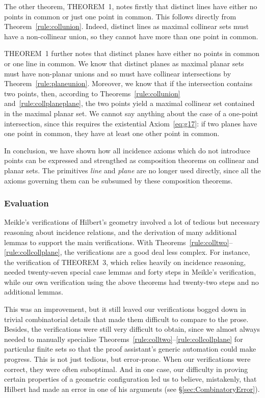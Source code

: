 The other theorem, THEOREM~1, notes firstly that distinct lines have either no points in common or just one point in common. This follows directly from Theorem~\ref{rule:collunion}. Indeed, distinct lines as maximal collinear sets must have a non-collinear union, so they cannot have more than one point in common.

THEOREM~1 further notes that distinct planes have either no points in common or one line in common. We know that distinct planes as maximal planar sets must have non-planar unions and so must have collinear intersections by Theorem~\ref{rule:planeunion}. Moreover, we know that if the intersection contains two points, then, according to Theorems~\ref{rule:collunion} and~\ref{rule:collplaneplane}, the two points yield a maximal collinear set contained in the maximal planar set. We cannot say anything about the case of a one-point intersection, since this requires the existential Axiom~\ref{eq:g17}: if two planes have one point in common, they have at least one other point in common.

In conclusion, we have shown how all incidence axioms which do not introduce points can be expressed and strengthed as composition theorems on collinear and planar sets. The primitives \emph{line} and \emph{plane} are no longer used directly, since all the axioms governing them can be subsumed by these composition theorems.

\subsubsection{Evaluation}
Meikle's verifications of Hilbert's geometry involved a lot of tedious but necessary reasoning about incidence relations, and the derivation of many additional lemmas to support the main verifications. With Theorems~\ref{rule:colltwo}--\ref{rule:collcollplane}, the verifications are a good deal less complex. For instance, the verification of THEOREM~3, which relies heavily on incidence reasoning, needed twenty-seven special case lemmas and forty steps in Meikle's verification, while our own verification using the above theorems had twenty-two steps and no additional lemmas. 

This was an improvement, but it still leaved our verifications bogged down in trivial combinatorial details that made them difficult to compare to the prose. Besides, the verifications were still very difficult to obtain, since we almost always needed to manually specialise Theorems~\ref{rule:colltwo}--\ref{rule:collcollplane} for particular finite sets so that the proof assistant's generic automation could make progress. This is not just tedious, but error-prone. When our verifications were correct, they were often suboptimal. And in one case, our difficulty in proving certain properties of a geometric configuration led us to believe, mistakenly, that Hilbert had made an error in one of his arguments (see \S\ref{sec:CombinatoryError}).

